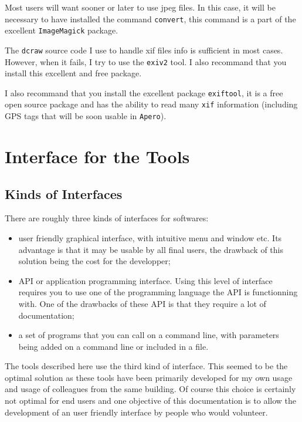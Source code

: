 Most users will want sooner or later to use jpeg files. In this case, it will be necessary
to have installed the command {\tt convert}, this command is a part of the excellent
{\tt ImageMagick} package.


The {\tt dcraw} source code I use to handle xif files info is sufficient in most cases.
However, when it fails, I try to use the {\tt exiv2} tool. I also recommand that 
you install this excellent and free package.

I also recommand that you install the excellent package {\tt exiftool}, it is a free
open source package and has the ability to read many {\tt xif} information (including
GPS tags that will be soon usable in {\tt Apero}).




\section{Interface for the Tools}

\subsection{Kinds of Interfaces}
There are roughly three kinds of interfaces for softwares:

\begin{itemize}
   \item user friendly graphical interface, with intuitive menu and window etc.
         Its advantage is that it may be usable by all final users, 
         the drawback of this solution being the cost for the developper;

   \item API or application programming interface. Using this level of interface requires you
         to use one of the programming language the API is functionning with. One of
         the drawbacks of these API is that they require a lot of documentation;

   \item a set of programs that you can call on a command line, with parameters being
         added on a command line or included in a file.
         
\end{itemize}

The tools described here use the third kind of interface. This seemed to be the
optimal solution as these tools have been primarily developed for my own usage and
usage of colleagues from the same building.  Of course this choice is certainly
not optimal for end users and one objective of this documentation is to  allow
the development of an user friendly interface by people who would volunteer.

